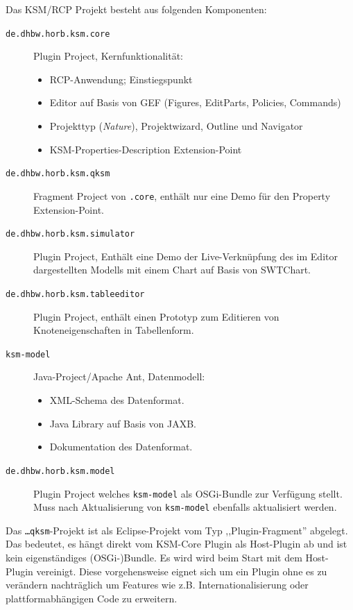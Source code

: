 \documentclass[%
12pt,titlepage,abstracton,DIV=10]{scrreprt}
\begin{document}
Das KSM/RCP Projekt besteht aus folgenden Komponenten:
\begin{description}
  \item[\texttt{de.\-dhbw.\-horb.\-ksm.\-core}] Plugin
  Project, Kernfunktionalität:
  \begin{itemize}
    \item RCP-Anwendung; Einstiegspunkt
  	\item Editor auf Basis von GEF (Figures, EditParts, Policies, Commands)
  	\item Projekttyp (\textit{Nature}), Projektwizard, Outline und Navigator
  	\item KSM-Properties-Description Extension-Point
  \end{itemize}
  \item[\texttt{de.\-dhbw.\-horb.\-ksm.\-qksm}] Fragment Project von
  \texttt{.core}, enthält nur eine Demo für den Property Extension-Point.
  \item[\texttt{de.\-dhbw.\-horb.\-ksm.\-simulator}] Plugin Project, Enthält eine Demo der
  Live-Verknüpfung des im Editor dargestellten Modells mit einem Chart auf
  Basis von SWTChart.
  \item[\texttt{de.\-dhbw.\-horb.\-ksm.\-tableeditor}] Plugin Project, enthält
  einen Prototyp zum Editieren von Knoteneigenschaften in Tabellenform.
  \item[\texttt{ksm-model}]
  Java-Project/Apache Ant, Datenmodell:
  \begin{itemize}
    \item XML-Schema des Datenformat.
    \item Java Library auf Basis von JAXB.
    \item Dokumentation des Datenformat.
  \end{itemize}
  \item[\texttt{de.\-dhbw.\-horb.\-ksm.\-model}] Plugin Project welches
  \texttt{ksm-model} als OSGi-Bundle zur Verfügung stellt. Muss nach
  Aktualisierung von \texttt{ksm-model} ebenfalls aktualisiert werden.
\end{description}

Das \texttt{\ldots qksm}-Projekt ist als Eclipse-Projekt vom Typ
,,Plugin-Fragment'' abgelegt. Das bedeutet, es hängt direkt vom KSM-Core Plugin
als Host-Plugin ab und ist kein eigenständiges (OSGi-)Bundle. Es wird wird beim
Start mit dem Host-Plugin vereinigt. Diese vorgehensweise eignet sich um ein
Plugin ohne es zu verändern nachträglich um Features wie z.B.
Internationalisierung oder plattformabhängigen Code zu erweitern.
\end{document}
